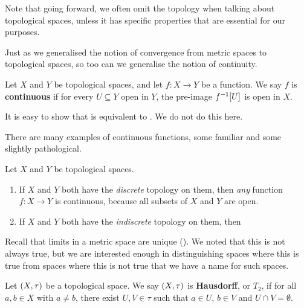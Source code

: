 Note that going forward, we often omit the topology when talking about topological spaces, unless it has specific properties that are essential for our purposes.

Just as we generalised the notion of convergence from metric spaces to topological spaces, so too can we generalise the notion of continuity.

\begin{boxdefinition}[Continuity]\label{Ch1:Def:Continuity_Topological}
    Let $X$ and $Y$ be topological spaces, and let $f : X \to Y$ be a function. We say $f$ is \textbf{continuous} if for every $U \subseteq Y$ open in $Y$, the pre-image $f^{-1}\!\left[ U \right]$ is open in $X$.
\end{boxdefinition}

It is easy to show that  is equivalent to . We do not do this here.

There are many examples of continuous functions, some familiar and some slightly pathological.

\begin{boxexample}
    Let $X$ and $Y$ be topological spaces.
    \begin{enumerate}
        \item If $X$ and $Y$ both have the \textit{discrete} topology on them, then \textit{any} function $f : X \to Y$ is continuous, because all subsets of $X$ and $Y$ are open.

        \item If $X$ and $Y$ both have the \textit{indiscrete} topology on them, then \sorry
    \end{enumerate}
\end{boxexample}

Recall that limits in a metric space are unique (). We noted that this is not always true, but we are interested enough in distinguishing spaces where this is true from spaces where this is not true that we have a name for such spaces.

\begin{boxdefinition}\label{Ch1:Def:Hausdorff}
    Let $\left( X, \tau \right)$ be a topological space. We say $\left( X, \tau \right)$ is \textbf{Hausdorff}, or $T_2$, if for all $a, b \in X$ with $a \neq b$, there exist $U, V \in \tau$ such that $a \in U$, $b \in V$ and $U \cap V = \emptyset$.
\end{boxdefinition}

